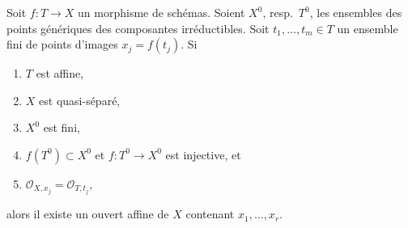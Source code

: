 \begin{lemma}
\label{lemma-points-in-affine}
Soit $f : T \to X$ un morphisme de schémas. Soient $X^0$, resp.\ $T^0$,
les ensembles des points génériques des composantes irréductibles.
Soit $t_1, \ldots, t_m \in T$ un ensemble fini de points
d'images $x_j = f(t_j)$. Si
\begin{enumerate}
\item $T$ est affine,
\item $X$ est quasi-séparé,
\item $X^0$ est fini,
\item $f(T^0) \subset X^0$ et $f : T^0 \to X^0$ est injective, et
\item $\mathcal{O}_{X, x_j} = \mathcal{O}_{T, t_j}$,
\end{enumerate}
alors il existe un ouvert affine de $X$ contenant $x_1, \ldots, x_r$.
\end{lemma}


